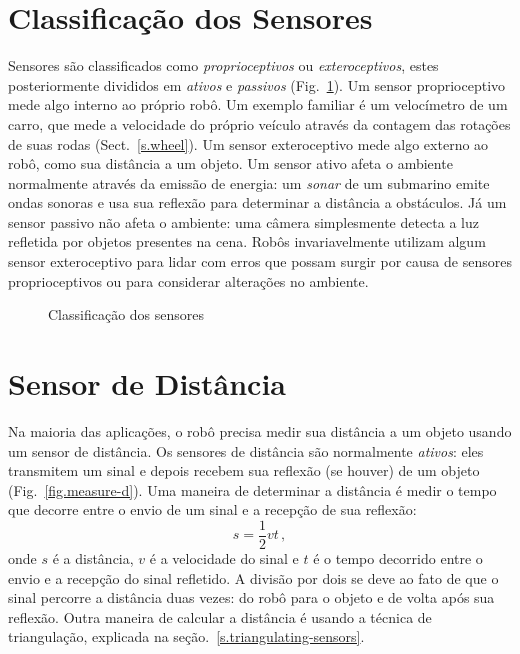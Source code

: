 \section{Classificação dos Sensores}\label{s.classify}

Sensores são classificados como \emph{proprioceptivos} ou \emph{exteroceptivos}, estes posteriormente divididos em \emph{ativos} e \emph{passivos} (Fig.~\ref{fig.sensor-classification}). Um sensor proprioceptivo mede algo interno ao próprio robô. Um exemplo familiar é um velocímetro de um carro, que mede a velocidade do próprio veículo através da contagem das rotações de suas rodas (Sect.~\ref{s.wheel}). Um sensor exteroceptivo mede algo externo ao robô, como sua distância a um objeto. Um sensor ativo afeta o ambiente normalmente através da emissão de energia: um \emph{sonar} de um submarino emite ondas sonoras e usa sua reflexão para determinar a distância a obstáculos. Já um sensor passivo não afeta o ambiente: uma câmera simplesmente detecta a luz refletida por objetos presentes na cena. Robôs invariavelmente utilizam algum sensor exteroceptivo para lidar com erros que possam surgir por causa de sensores proprioceptivos ou para considerar alterações no ambiente. 

\begin{figure}
\begin{center}
\caption{Classificação dos sensores}\label{fig.sensor-classification}
\end{center}
\end{figure}

\section{Sensor de Distância}\label{s.distance-sensors}

Na maioria das aplicações, o robô precisa medir sua distância a um objeto usando um sensor de distância. Os sensores de distância são normalmente \emph{ativos}: eles transmitem um sinal e depois recebem sua reflexão (se houver) de um objeto (Fig.~\ref{fig.measure-d}). Uma maneira de determinar a distância é medir o tempo que decorre entre o envio de um sinal e a recepção de sua reflexão:
\begin{equation}
s = \frac{1}{2}vt\,,\label{eq.reflected}
\end{equation}
onde $s$ é a distância, $v$ é a velocidade do sinal e $t$ é o tempo decorrido entre o envio e a recepção do sinal refletido. A divisão por dois se deve ao fato de que o sinal percorre a distância duas vezes: do robô para o objeto e de volta após sua reflexão. Outra maneira de calcular a distância é usando a técnica de triangulação, explicada na seção.~\ref{s.triangulating-sensors}.

